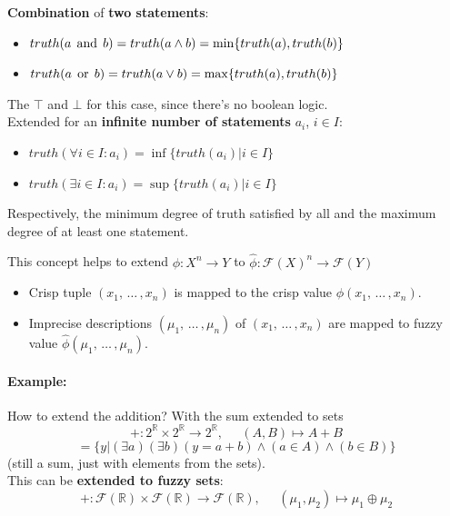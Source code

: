 \textbf{Combination} of \textbf{two statements}: 
\begin{itemize}
	\item $truth (a \operatorname*{\; and \;} b) = truth(a \wedge b) = \min\{truth(a), truth(b) \}$
	\item $truth (a \operatorname*{\; or \;} b) = truth(a \vee b) = \max\{truth(a), truth(b) \}$
\end{itemize}
The $\top$ and $\bot$ for this case, since there's no boolean logic.\\

Extended for an \textbf{infinite number of statements} $a_i$, $i \in I$:
\begin{itemize}
	\item $truth(\forall i \in I: a_i) = \inf \{truth (a_i) | i \in I \}$
	\item $truth(\exists i \in I: a_i) = \sup \{truth (a_i) | i \in I \}$
\end{itemize}
Respectively, the minimum degree of truth satisfied by all and the maximum degree of at least one statement.\\

\newpage

This concept helps to extend $\phi: X^n \rightarrow Y$ to $\hat \phi : \mathcal{F}(X)^n \rightarrow \mathcal{F}(Y)$
\begin{itemize}[label*=]
	\item Crisp tuple $(x_1, \, \dots \, , x_n)$ is mapped to the crisp value $\phi (x_1, \, \dots \, , x_n)$.\\
	
	\item Imprecise descriptions $(\mu_1 , \, \dots \, , \mu_n)$ of $(x_1, \, \dots \, , x_n)$ are mapped to fuzzy value $\hat \phi (\mu_1, \, \dots \, , \mu_n)$.\\
\end{itemize}

\paragraph{Example:} How to extend the addition? With the sum extended to sets
$$ +: 2^{\mathbb{R}} \times 2^{\mathbb{R}} \rightarrow 2^{\mathbb{R}}, \;\;\;\;\; (A,B) \mapsto A + B $$
$$ = \{y | (\exists a) (\exists b) (y = a + b) \wedge (a \in A) \wedge (b \in B) \} $$
(still a sum, just with elements from the sets).\\

This can be \textbf{extended to fuzzy sets}: 
$$ +: \mathcal{F} (\mathbb{R}) \times \mathcal{F} (\mathbb{R}) \rightarrow \mathcal{F} (\mathbb{R}), \;\;\;\;\; (\mu_1, \mu_2) \mapsto \mu_1 \oplus \mu_2$$

